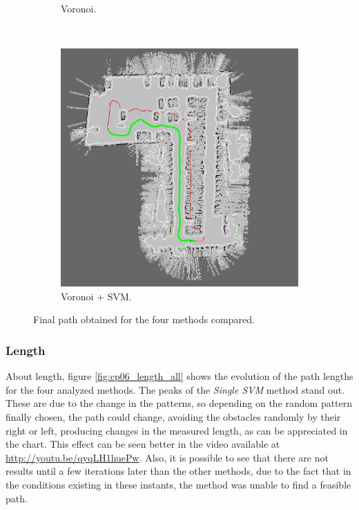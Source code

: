 \begin{figure}[h!]
\begin{subfigure}[b]{0.45\textwidth}
	  \caption{Voronoi.}
	  \label{fig:cp06_voronoi_final}
  \end{subfigure}%
  ~
  \begin{subfigure}[b]{0.45\textwidth}
	  \centering
	  \includegraphics[width=\textwidth,height=\textwidth, trim=0 0 0 0,clip]{figure17}
	  \caption{Voronoi + \ac{SVM}.}
	  \label{fig:cp06_voronoi_svm_final}
  \end{subfigure}
  \caption{Final path obtained for the four methods compared.}\label{fig:cp06_final_path_comparison}
\end{figure}

\subsubsection{Length}\label{ch:chapter06_02_02_03}

About length, figure \ref{fig:cp06_length_all} shows the evolution of the path lengths for the four analyzed methods. The peaks of the \textit{Single \ac{SVM}} method stand out. These are due to the change in the patterns, so depending on the random pattern finally chosen, the path could change, avoiding the obstacles randomly by their right or left, producing changes in the measured length, as can be appreciated in the chart. This effect can be seen better in the video available at \url{http://youtu.be/qyqLH1huePw}. Also, it is possible to see that there are not results until a few iterations later than the other methods, due to the fact that in the conditions existing in these instants, the method was unable to find a feasible path.

